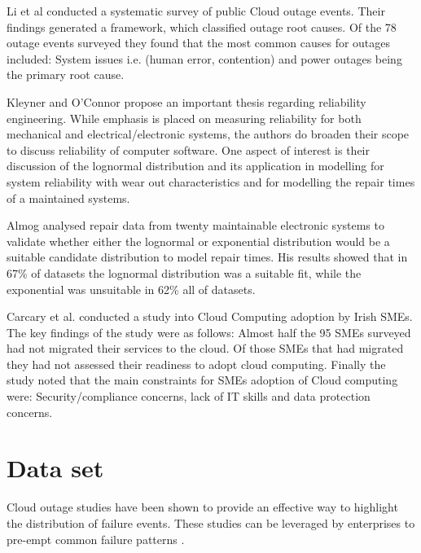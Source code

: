 \documentclass[conference]{IEEEtran}
\begin{document}
Li et al \cite{li2013cloud} conducted a systematic survey of public Cloud outage events. Their findings generated a  framework, which classified outage root causes. Of the 78 outage events surveyed they found that the most common causes for outages included: System issues i.e. (human error, contention) and power outages being the primary root cause. \par

Kleyner and O'Connor \cite{o2011practical} propose an important thesis regarding reliability engineering. While emphasis is placed on measuring reliability for both mechanical and electrical/electronic systems, the authors do broaden their scope to discuss reliability of computer software. One aspect of interest is their discussion of the lognormal distribution and its application in modelling for system reliability with wear out characteristics and for modelling the repair times of a maintained systems. \par

Almog \cite{almog1979study} analysed repair data from twenty maintainable electronic systems to validate whether either the lognormal or exponential distribution would be a suitable candidate distribution to model repair times. His results showed that in 67\% of datasets the lognormal distribution was a suitable fit, while the exponential was unsuitable in 62\% all of datasets. \par

Carcary et al. \cite{carcary2014adoption} conducted a study into Cloud Computing adoption by Irish SMEs. The key findings of the study were as follows: Almost half the 95 SMEs surveyed had not migrated their services to the cloud. Of those SMEs that had migrated they had not assessed their readiness to adopt cloud computing. Finally the study noted that the main constraints for SMEs adoption of Cloud computing were: Security/compliance concerns, lack of IT skills and data protection concerns. \par

\section{Data set}

Cloud outage studies have been shown to provide an effective way to highlight the distribution of failure events. These studies can be leveraged by enterprises to pre-empt common failure patterns \cite{InfoWorld2015outage} \cite{CRN2015outage}. \par
\end{document}
